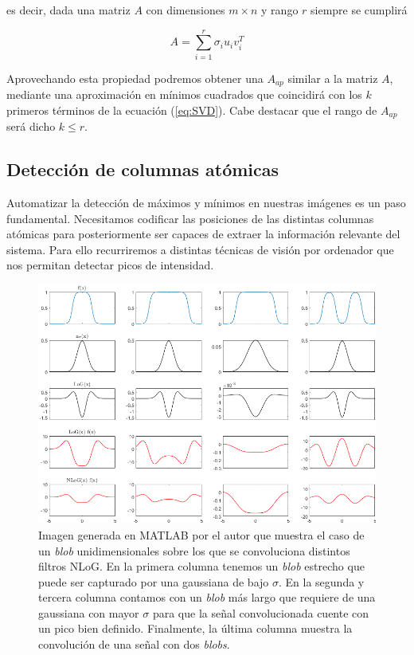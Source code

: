 es decir, dada una matriz $A$ con dimensiones $m \times n$ y rango $r$ siempre se cumplirá

\begin{equation} \label{eq:SVD}
    A = \sum^r_{i=1} \sigma_i u_i v_i^T 
\end{equation}

Aprovechando esta propiedad podremos obtener una $A_{ap}$ similar a la matriz $A$, mediante una aproximación en mínimos cuadrados que coincidirá con los $k$ primeros términos de la ecuación (\ref{eq:SVD}). Cabe destacar que el rango de $A_{ap}$ será dicho $k \leq r$. \\

\subsection{Detección de columnas atómicas}

Automatizar la detección de máximos y mínimos en nuestras imágenes es un paso fundamental. Necesitamos codificar las posiciones de las distintas columnas atómicas para posteriormente ser capaces de extraer la información relevante del sistema. Para ello recurriremos a distintas técnicas de visión por ordenador que nos permitan detectar picos de intensidad. 

\begin{figure}[h!]
    \centering
    \includegraphics[width=1\textwidth]{fig/Fig5.png}
    \caption{Imagen generada en MATLAB por el autor \cite{repo} que muestra el caso de un \textit{blob} unidimensionales sobre los que se convoluciona distintos filtros NLoG. En la primera columna tenemos un \textit{blob} estrecho que puede ser capturado por una gaussiana de bajo $\sigma$. En la segunda y tercera columna contamos con un \textit{blob} más largo que requiere de una gaussiana con mayor $\sigma$ para que la señal convolucionada cuente con un pico bien definido. Finalmente, la última columna muestra la convolución de una señal con dos \textit{blobs}.}
    \label{fig:5}
\end{figure}


